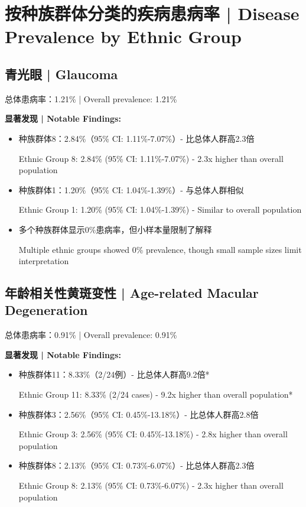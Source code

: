\documentclass[12pt,a4paper]{article}
\begin{document}
\section{按种族群体分类的疾病患病率 | Disease Prevalence by Ethnic Group}

\subsection{青光眼 | Glaucoma}

总体患病率：1.21\% | Overall prevalence: 1.21\%

\textbf{显著发现 | Notable Findings:}
\begin{itemize}
    \item 种族群体8：2.84\%（95\% CI: 1.11\%-7.07\%）- 比总体人群高2.3倍
    
    Ethnic Group 8: 2.84\% (95\% CI: 1.11\%-7.07\%) - 2.3x higher than overall population
    
    \item 种族群体1：1.20\%（95\% CI: 1.04\%-1.39\%）- 与总体人群相似
    
    Ethnic Group 1: 1.20\% (95\% CI: 1.04\%-1.39\%) - Similar to overall population
    
    \item 多个种族群体显示0\%患病率，但小样本量限制了解释
    
    Multiple ethnic groups showed 0\% prevalence, though small sample sizes limit interpretation
\end{itemize}

\subsection{年龄相关性黄斑变性 | Age-related Macular Degeneration}

总体患病率：0.91\% | Overall prevalence: 0.91\%

\textbf{显著发现 | Notable Findings:}
\begin{itemize}
    \item 种族群体11：8.33\%（2/24例）- 比总体人群高9.2倍*
    
    Ethnic Group 11: 8.33\% (2/24 cases) - 9.2x higher than overall population*
    
    \item 种族群体3：2.56\%（95\% CI: 0.45\%-13.18\%）- 比总体人群高2.8倍
    
    Ethnic Group 3: 2.56\% (95\% CI: 0.45\%-13.18\%) - 2.8x higher than overall population
    
    \item 种族群体8：2.13\%（95\% CI: 0.73\%-6.07\%）- 比总体人群高2.3倍
    
    Ethnic Group 8: 2.13\% (95\% CI: 0.73\%-6.07\%) - 2.3x higher than overall population
\end{itemize}
\end{document}
